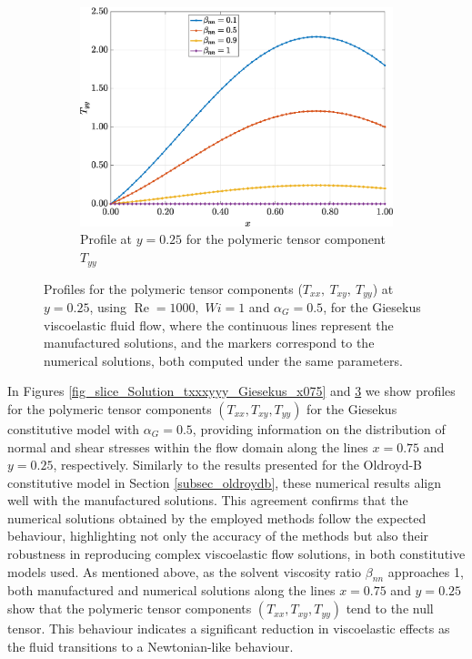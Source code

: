 \documentclass[preprint, 12pt]{elsarticle}
\begin{document}
\begin{figure}[H]
\begin{subfigure}[b]{.46\textwidth}
        \label{fig_slice_y_txy_2nd_Case1_giesekus_y025}
    \end{subfigure}
    \begin{subfigure}[b]{.46\textwidth}
        \includegraphics[width=\textwidth]{Slice_y_Tog_Numerical_NormErr_2nd_Betann_1_Re_1000_Wi_1_epsilon_0_xi_0_alphaG_0.5_Dt_1e-06_at_0.05_tipsim_1_MMS_12_x0.25y0.25_Tyy.eps}
        \caption{Profile at $y=0.25$ for the polymeric tensor component $T_{yy}$}
        \label{fig_slice_y_tyy_2nd_Case1_giesekus_y025}
    \end{subfigure}
    \vspace{0.02cm}
    \caption{Profiles for the polymeric tensor components ($T_{xx},~T_{xy},~T_{yy}$) at $y=0.25$, using $\operatorname{Re}=1000,$ $Wi=1$ and $\alpha_{G} = 0.5$, for the Giesekus viscoelastic fluid flow, where the continuous lines represent the manufactured solutions, and the markers correspond to the numerical solutions, both computed under the same parameters.\label{fig_slice_Solution_txxxyyy_Giesekus_y025}}
\end{figure}

In Figures \ref{fig_slice_Solution_txxxyyy_Giesekus_x075} and
\ref{fig_slice_Solution_txxxyyy_Giesekus_y025} we show profiles for the
polymeric tensor components $(T_{xx}, T_{xy}, T_{yy})$ for the Giesekus
constitutive model with $\alpha_G = 0.5$, providing information on the
distribution of normal and shear stresses within the flow domain along the
lines $x=0.75$ and $y=0.25$, respectively. Similarly to the results presented
for the Oldroyd-B constitutive model in Section \ref{subsec_oldroydb}, these
numerical results align well with the manufactured solutions. This agreement
confirms that the numerical solutions obtained by the employed methods follow
the expected behaviour, highlighting not only the accuracy of the methods but
also their robustness in reproducing complex viscoelastic flow solutions, in
both constitutive models used. As mentioned above, as the solvent viscosity
ratio $\beta_{nn}$ approaches 1, both manufactured and numerical solutions
along the lines $x=0.75$ and \mbox{$y=0.25$} show that the polymeric tensor
components $(T_{xx}, T_{xy}, T_{yy})$ tend to the null tensor. This behaviour
indicates a significant reduction in viscoelastic effects as the fluid
transitions to a Newtonian-like behaviour. 
\end{document}
